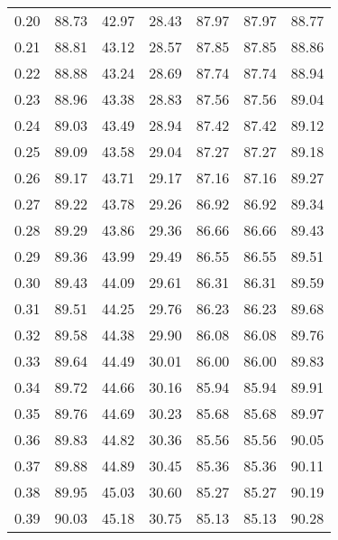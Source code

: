 \begin{tabular}{|c|c|c|c|c|c|c|}
      0.20 &     88.73 &     42.97 &      28.43 &   87.97 &      87.97 &         88.77 \\
      0.21 &     88.81 &     43.12 &      28.57 &   87.85 &      87.85 &         88.86 \\
      0.22 &     88.88 &     43.24 &      28.69 &   87.74 &      87.74 &         88.94 \\
      0.23 &     88.96 &     43.38 &      28.83 &   87.56 &      87.56 &         89.04 \\
      0.24 &     89.03 &     43.49 &      28.94 &   87.42 &      87.42 &         89.12 \\
      0.25 &     89.09 &     43.58 &      29.04 &   87.27 &      87.27 &         89.18 \\
      0.26 &     89.17 &     43.71 &      29.17 &   87.16 &      87.16 &         89.27 \\
      0.27 &     89.22 &     43.78 &      29.26 &   86.92 &      86.92 &         89.34 \\
      0.28 &     89.29 &     43.86 &      29.36 &   86.66 &      86.66 &         89.43 \\
      0.29 &     89.36 &     43.99 &      29.49 &   86.55 &      86.55 &         89.51 \\
      0.30 &     89.43 &     44.09 &      29.61 &   86.31 &      86.31 &         89.59 \\
      0.31 &     89.51 &     44.25 &      29.76 &   86.23 &      86.23 &         89.68 \\
      0.32 &     89.58 &     44.38 &      29.90 &   86.08 &      86.08 &         89.76 \\
      0.33 &     89.64 &     44.49 &      30.01 &   86.00 &      86.00 &         89.83 \\
      0.34 &     89.72 &     44.66 &      30.16 &   85.94 &      85.94 &         89.91 \\
      0.35 &     89.76 &     44.69 &      30.23 &   85.68 &      85.68 &         89.97 \\
      0.36 &     89.83 &     44.82 &      30.36 &   85.56 &      85.56 &         90.05 \\
      0.37 &     89.88 &     44.89 &      30.45 &   85.36 &      85.36 &         90.11 \\
      0.38 &     89.95 &     45.03 &      30.60 &   85.27 &      85.27 &         90.19 \\
      0.39 &     90.03 &     45.18 &      30.75 &   85.13 &      85.13 &         90.28 \\

\end{tabular}
